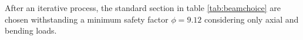 	After an iterative process, the standard section in table \ref{tab:beamchoice} are chosen withstanding a minimum safety factor $\phi = 9.12$ considering only axial and bending loads.
	
	
	
	

	
	
	
	
	
	
	
	
	
	
	
	
	
	
	
	
	
	
	
	
	
	
	
	
	
	
	
	
	
	
	
	